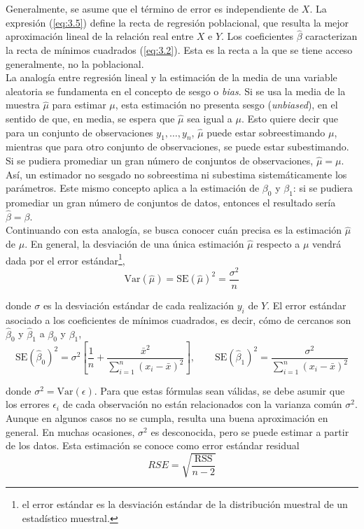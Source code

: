 Generalmente, se asume que el término de error es independiente de $X$. La expresión (\ref{eq:3.5}) define la recta de regresión poblacional, que resulta la mejor aproximación lineal de la relación real entre $X$ e $Y$. Los coeficientes $\hat{\beta}$ caracterizan la recta de mínimos cuadrados (\ref{eq:3.2}). Esta es la recta a la que se tiene acceso generalmente, no la poblacional. \\

La analogía entre regresión lineal y la estimación de la media de una variable aleatoria se fundamenta en el concepto de sesgo o \textit{bias}. Si se usa la media de la muestra $\hat{\mu}$ para estimar $\mu$, esta estimación no presenta sesgo (\textit{unbiased}), en el sentido de que, en media, se espera que $\hat{\mu}$ sea igual a $\mu$. Esto quiere decir que para un conjunto de observaciones $y_1, \dots, y_n$, $\hat{\mu}$ puede estar sobreestimando $\mu$, mientras que para otro conjunto de observaciones, se puede estar subestimando. Si se pudiera promediar un gran número de conjuntos de observaciones, $\hat{\mu} = \mu$. Así, un estimador no sesgado no sobreestima ni subestima sistemáticamente los parámetros. Este mismo concepto aplica a la estimación de $\beta_0$ y $\beta_1$: si se pudiera promediar un gran número de conjuntos de datos, entonces el resultado sería $\hat{\beta} = \beta$. \\

Continuando con esta analogía, se busca conocer cuán precisa es la estimación $\hat{\mu}$ de $\mu$. En general, la desviación de una única estimación $\hat{\mu}$ respecto a $\mu$ vendrá dada por el error estándar\footnote{el error estándar es la desviación estándar de la distribución muestral de un estadístico muestral.}, 
\begin{equation}
\text{Var}(\hat{\mu}) = \text{SE}(\hat{\mu})^2 = \frac{\sigma^2}{n}
\end{equation}

\noindent donde $\sigma$ es la desviación estándar de cada realización $y_i$ de $Y$. El error estándar asociado a los coeficientes de mínimos cuadrados, es decir, cómo de cercanos son $\hat{\beta}_0$ y $\hat{\beta}_1$ a $\beta_0$ y $\beta_1$, 
\begin{equation}
\text{SE}(\hat{\beta}_0)^2 = \sigma^2 \left[\frac{1}{n} + \frac{\bar{x}^2}{\sum_{i=1}^n (x_i - \bar{x})^2}\right], \qquad \text{SE}(\hat{\beta}_1)^2 = \frac{\sigma^2}{\sum_{i=1}^n (x_i - \bar{x})^2}
\end{equation}

\noindent donde $\sigma^2 = \text{Var}(\epsilon)$. Para que estas fórmulas sean válidas, se debe asumir que los errores $\epsilon_i$ de cada observación no están relacionados con la varianza común $\sigma^2$. Aunque en algunos casos no se cumpla, resulta una buena aproximación en general. En muchas ocasiones, $\sigma^2$ es desconocida, pero se puede estimar a partir de los datos. Esta estimación se conoce como error estándar residual
\begin{equation}
RSE = \sqrt{\frac{\text{RSS}}{n-2}}
\end{equation}

